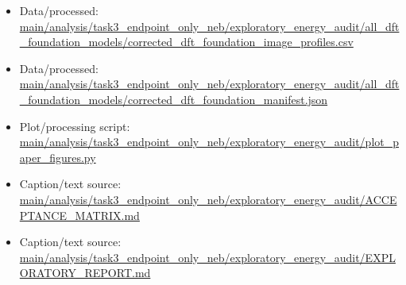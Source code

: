 \begin{itemize}[leftmargin=1.4em,noitemsep]
\item Data/processed: \begingroup\scriptsize\url{main/analysis/task3_endpoint_only_neb/exploratory_energy_audit/all_dft_foundation_models/corrected_dft_foundation_image_profiles.csv}\endgroup
\item Data/processed: \begingroup\scriptsize\url{main/analysis/task3_endpoint_only_neb/exploratory_energy_audit/all_dft_foundation_models/corrected_dft_foundation_manifest.json}\endgroup
\item Plot/processing script: \begingroup\scriptsize\url{main/analysis/task3_endpoint_only_neb/exploratory_energy_audit/plot_paper_figures.py}\endgroup
\item Caption/text source: \begingroup\scriptsize\url{main/analysis/task3_endpoint_only_neb/exploratory_energy_audit/ACCEPTANCE_MATRIX.md}\endgroup
\item Caption/text source: \begingroup\scriptsize\url{main/analysis/task3_endpoint_only_neb/exploratory_energy_audit/EXPLORATORY_REPORT.md}\endgroup
\end{itemize}
